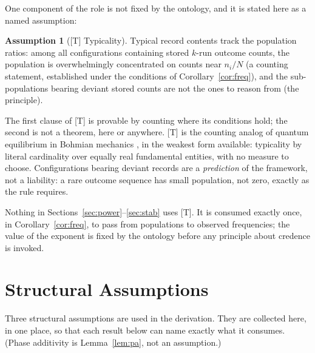 \documentclass[11pt]{article}
\theoremstyle{definition}
\newtheorem{assumption}{Assumption}
\theoremstyle{remark}
\begin{document}
One component of the role is not fixed by the ontology, and it is stated here as a named assumption:

\begin{assumption}[{[T]} Typicality]\label{ass:t}
Typical record contents track the population ratios: among all configurations containing stored $k$-run outcome counts, the population is overwhelmingly concentrated on counts near $n_i/N$ (a counting statement, established under the conditions of Corollary~\ref{cor:freq}), and the sub-populations bearing deviant stored counts are not the ones to reason from (the principle).
\end{assumption}

The first clause of [T] is provable by counting where its conditions hold; the second is not a theorem, here or anywhere. [T] is the counting analog of quantum equilibrium in Bohmian mechanics \cite{Durr1992}, in the weakest form available: typicality by literal cardinality over equally real fundamental entities, with no measure to choose. Configurations bearing deviant records are a \emph{prediction} of the framework, not a liability: a rare outcome sequence has small population, not zero, exactly as the rule requires.

Nothing in Sections~\ref{sec:power}--\ref{sec:stab} uses [T]. It is consumed exactly once, in Corollary~\ref{cor:freq}, to pass from populations to observed frequencies; the value of the exponent is fixed by the ontology before any principle about credence is invoked.

\section{Structural Assumptions}\label{sec:ass}
Three structural assumptions are used in the derivation. They are collected here, in one place, so that each result below can name exactly what it consumes. (Phase additivity is Lemma~\ref{lem:pa}, not an assumption.)
\end{document}

